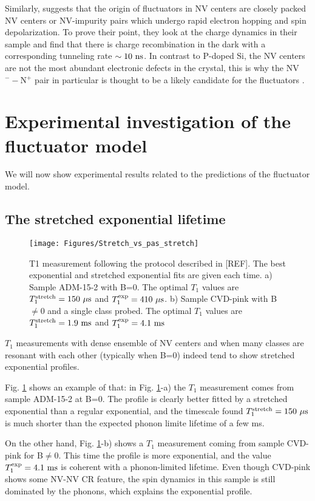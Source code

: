 \documentclass[a4paper,11pt]{report}
\begin{document}
Similarly, \citep{choi2017depolarization} suggests that the origin of fluctuators in NV centers are closely packed NV centers or NV-impurity pairs which undergo rapid electron hopping and spin depolarization. To prove their point, they look at the charge dynamics in their sample and find that there is charge recombination in the dark with a corresponding tunneling rate $\sim 10\ \rm ns$. In contrast to P-doped Si, the NV centers are not the most abundant electronic defects in the crystal, this is why the NV$^--$N$^+$ pair in particular is thought to be a likely candidate for the fluctuators \citep{manson2018nv}.

\section{Experimental investigation of the fluctuator model}
We will now show experimental results related to the predictions of the fluctuator model.
\subsection{The stretched exponential lifetime}
\begin{figure}[h]
\centering
\texttt{[image: Figures/Stretch\_vs\_pas\_stretch]}
\caption{T1 measurement following the protocol described in [REF]. The best exponential and stretched exponential fits are given each time. a) Sample ADM-15-2 with B=0. The optimal $T_1$ values are $T_1^{\rm stretch}=150\ \mu \rm s$ and $T_1^{\rm exp}=410\ \mu \rm s$. b) Sample CVD-pink with B$\neq$0 and a single class probed. The optimal $T_1$ values are $T_1^{\rm stretch}=1.9\ \rm ms$ and $T_1^{\rm exp}=4.1\ \rm ms$}
\label{stretch_or_not_stretch}
\end{figure}
$T_1$ measurements with dense ensemble of NV centers and when many classes are resonant with each other (typically when B=0) indeed tend to show stretched exponential profiles.

Fig. \ref{stretch_or_not_stretch} shows an example of that: in Fig. \ref{stretch_or_not_stretch}-a) the $T_1$ measurement comes from sample ADM-15-2 at B=0. The profile is clearly better fitted by a stretched exponential than a regular exponential, and the timescale found $T_1^{\rm stretch}=150\ \mu \rm s$ is much shorter than the expected phonon limite lifetime of a few ms.

On the other hand, Fig. \ref{stretch_or_not_stretch}-b) shows a $T_1$ measurement coming from sample CVD-pink for B$\neq$0. This time the profile is more exponential, and the value $T_1^{\rm exp}=4.1\ \rm ms$ is coherent with a phonon-limited lifetime. Even though CVD-pink shows some NV-NV CR feature, the spin dynamics in this sample is still dominated by the phonons, which explains the exponential profile.
\end{document}
